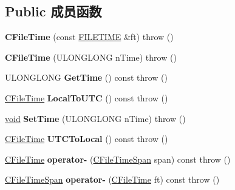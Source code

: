 \subsection*{Public 成员函数}
\begin{DoxyCompactItemize}
\item 
\mbox{\label{class_a_t_l_1_1_c_file_time_a6ba38c77bbd522a21761e3e24686b65b}} 
{\bfseries C\+File\+Time} (const \hyperlink{struct___f_i_l_e_t_i_m_e}{F\+I\+L\+E\+T\+I\+ME} \&ft)  throw ()
\item 
\mbox{\label{class_a_t_l_1_1_c_file_time_a1fe2a6f918020e7f4b2776f18f04aaf3}} 
{\bfseries C\+File\+Time} (U\+L\+O\+N\+G\+L\+O\+NG n\+Time)  throw ()
\item 
\mbox{\label{class_a_t_l_1_1_c_file_time_a31f9593fe2f3f100794c36cb168518e5}} 
U\+L\+O\+N\+G\+L\+O\+NG {\bfseries Get\+Time} () const  throw ()
\item 
\mbox{\label{class_a_t_l_1_1_c_file_time_ac016e6a00b35a5eced9ea62962d9e6e3}} 
\hyperlink{class_a_t_l_1_1_c_file_time}{C\+File\+Time} {\bfseries Local\+To\+U\+TC} () const  throw ()
\item 
\mbox{\label{class_a_t_l_1_1_c_file_time_ac961a5ecfc30d348e968f97fd6a0b673}} 
\hyperlink{interfacevoid}{void} {\bfseries Set\+Time} (U\+L\+O\+N\+G\+L\+O\+NG n\+Time)  throw ()
\item 
\mbox{\label{class_a_t_l_1_1_c_file_time_a80088e03412ad9396a466534389f94b6}} 
\hyperlink{class_a_t_l_1_1_c_file_time}{C\+File\+Time} {\bfseries U\+T\+C\+To\+Local} () const  throw ()
\item 
\mbox{\label{class_a_t_l_1_1_c_file_time_a6e5d80bf7d04cda6462546ebe6f26f04}} 
\hyperlink{class_a_t_l_1_1_c_file_time}{C\+File\+Time} {\bfseries operator-\/} (\hyperlink{class_a_t_l_1_1_c_file_time_span}{C\+File\+Time\+Span} span) const  throw ()
\item 
\mbox{\label{class_a_t_l_1_1_c_file_time_a978814a8f5e003271fe7bd9fa21997b3}} 
\hyperlink{class_a_t_l_1_1_c_file_time_span}{C\+File\+Time\+Span} {\bfseries operator-\/} (\hyperlink{class_a_t_l_1_1_c_file_time}{C\+File\+Time} ft) const  throw ()

\end{DoxyCompactItemize}
